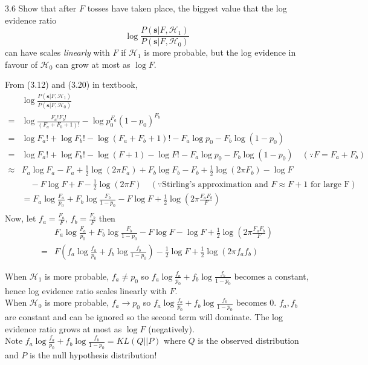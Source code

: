 \documentclass[12pt, a4paper]{article}
\begin{document}
\begin{prob}{3.6}
    Show that after $F$ tosses have taken place, the biggest value that the log evidence ratio \\
\begin{equation}
    \log \frac{P(\mathbf{s} | F, \mathcal{H}_1)}{P(\mathbf{s} | F, \mathcal{H}_0)} \tag{3.23}
\end{equation}
can have scales \textit{linearly} with $F$ if $\mathcal{H}_1$ is more probable, but the log evidence in favour of $\mathcal{H}_0$ can grow at most as $\log F$.
\end{prob}
\begin{sol}
    From (3.12) and (3.20) in textbook,
\begin{align*}
    & \log \frac{P(\mathbf{s} | F, \mathcal{H}_1)}{P(\mathbf{s} | F, \mathcal{H}_0)} \\
    =& \log \frac{F_a!F_b!}{(F_a+F_b+1)!} - \log p_0^{F_a}(1-p_0)^{F_b} \\
    =& \log F_a! + \log F_b! - \log (F_a + F_b + 1)! - F_a \log p_0 - F_b \log (1-p_0) \\
    =& \log F_a! + \log F_b! - \log (F+1) - \log F! - F_a \log p_0 - F_b \log (1-p_0) \quad (\because F = F_a + F_b) \\
    \approx& F_a \log F_a - F_a + \frac{1}{2} \log(2\pi F_a) + F_b \log F_b - F_b + \frac{1}{2} \log(2\pi F_b) - \log F \\
    & \quad - F \log F + F - \frac{1}{2} \log (2\pi F) \quad (\because \text{Stirling's approximation and } F \approx F + 1 \text{ for large F})\\
    &= F_a \log \frac{F_a}{p_0} + F_b \log \frac{F_b}{1-p_0} - F \log F + \frac{1}{2} \log (2\pi \frac{F_a F_b}{F}) \\
\end{align*}
Now, let $f_a = \frac{F_a}{F}$, $f_b = \frac{F_b}{F}$ then
\begin{align*}
    &F_a \log \frac{F_a}{p_0} + F_b \log \frac{F_b}{1-p_0} - F \log F - \log F + \frac{1}{2} \log (2\pi \frac{F_a F_b}{F})  
    \\=& F \left( f_a \log \frac{f_a}{p_0} + f_b \log \frac{f_b}{1-p_0} \right) - \frac{1}{2} \log F + \frac{1}{2} \log (2\pi f_a f_b)
\end{align*}

When $\mathcal{H}_1$ is more probable, $f_a \neq p_0$ so $f_a \log \frac{f_a}{p_0} + f_b \log \frac{f_b}{1-p_0}$ becomes a constant, hence log evidence ratio scales linearly with $F$. \\
When $\mathcal{H}_0$ is more probable, $f_a \rightarrow p_0$ so $f_a \log \frac{f_a}{p_0} + f_b \log \frac{f_b}{1-p_0}$ becomes 0. $f_a, f_b$ are constant and can be ignored so the second term will dominate. The log evidence ratio grows at most as $\log F$ (negatively). \\

Note $f_a \log \frac{f_a}{p_0} + f_b \log \frac{f_b}{1-p_0} = KL(Q||P)$ where $Q$ is the observed distribution and $P$ is the null hypothesis distribution!

\end{sol}
\bigskip
\end{document}
